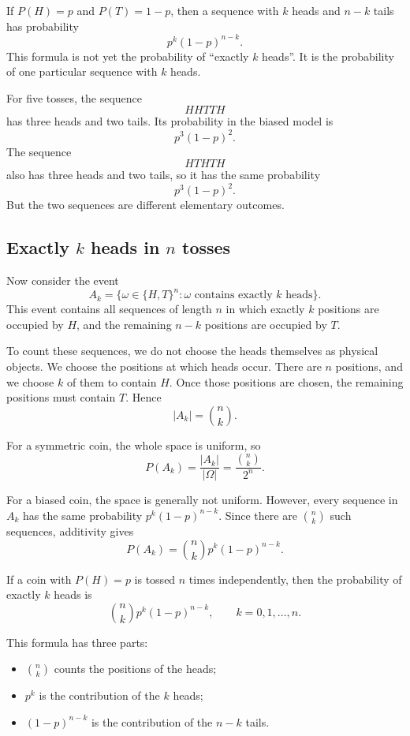 If \(P(H)=p\) and \(P(T)=1-p\), then a sequence with \(k\) heads and \(n-k\)
tails has probability
\[
p^k(1-p)^{n-k}.
\]
This formula is not yet the probability of ``exactly \(k\) heads''. It is the
probability of one particular sequence with \(k\) heads.

\begin{examplebox}
For five tosses, the sequence
\[
HHTTH
\]
has three heads and two tails. Its probability in the biased model is
\[
p^3(1-p)^2.
\]
The sequence
\[
HTHTH
\]
also has three heads and two tails, so it has the same probability
\[
p^3(1-p)^2.
\]
But the two sequences are different elementary outcomes.
\end{examplebox}

\subsection*{Exactly \(k\) heads in \(n\) tosses}

Now consider the event
\[
A_k=\{\omega\in\{H,T\}^n: \omega\text{ contains exactly }k\text{ heads}\}.
\]
This event contains all sequences of length \(n\) in which exactly \(k\) positions
are occupied by \(H\), and the remaining \(n-k\) positions are occupied by \(T\).

To count these sequences, we do not choose the heads themselves as physical
objects. We choose the positions at which heads occur. There are \(n\) positions,
and we choose \(k\) of them to contain \(H\). Once those positions are chosen,
the remaining positions must contain \(T\). Hence
\[
|A_k|=\binom{n}{k}.
\]

For a symmetric coin, the whole space is uniform, so
\[
P(A_k)=\frac{|A_k|}{|\Omega|}=\frac{\binom{n}{k}}{2^n}.
\]

For a biased coin, the space is generally not uniform. However, every sequence
in \(A_k\) has the same probability \(p^k(1-p)^{n-k}\). Since there are
\(\binom{n}{k}\) such sequences, additivity gives
\[
P(A_k)=\binom{n}{k}p^k(1-p)^{n-k}.
\]

\begin{theorembox}
If a coin with \(P(H)=p\) is tossed \(n\) times independently, then the
probability of exactly \(k\) heads is
\[
\binom{n}{k}p^k(1-p)^{n-k},
\qquad k=0,1,\ldots,n.
\]
\end{theorembox}

This formula has three parts:
\begin{itemize}
    \item \(\binom{n}{k}\) counts the positions of the heads;
    \item \(p^k\) is the contribution of the \(k\) heads;
    \item \((1-p)^{n-k}\) is the contribution of the \(n-k\) tails.
\end{itemize}

